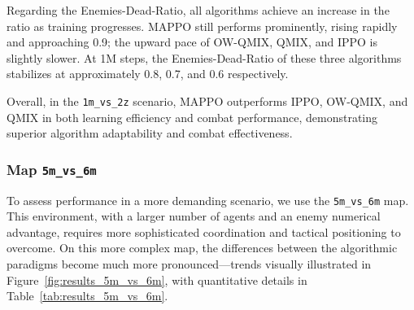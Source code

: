 Regarding the Enemies-Dead-Ratio, all algorithms achieve an increase in the ratio as training progresses. MAPPO still performs prominently, rising rapidly and approaching 0.9; the upward pace of OW-QMIX, QMIX, and IPPO is slightly slower. At 1M steps, the Enemies-Dead-Ratio of these three algorithms stabilizes at approximately 0.8, 0.7, and 0.6 respectively.

Overall, in the \texttt{1m\_vs\_2z} scenario, MAPPO outperforms IPPO, OW-QMIX, and QMIX in both learning efficiency and combat performance, demonstrating superior algorithm adaptability and combat effectiveness.


\subsubsection{Map \texttt{5m\_vs\_6m}}
To assess performance in a more demanding scenario, we use the \texttt{5m\_vs\_6m} map. This environment, with a larger number of agents and an enemy numerical advantage, requires more sophisticated coordination and tactical positioning to overcome.
On this more complex map, the differences between the algorithmic paradigms become much more pronounced---trends visually illustrated in Figure~\ref{fig:results_5m_vs_6m}, with quantitative details in Table~\ref{tab:results_5m_vs_6m}.
